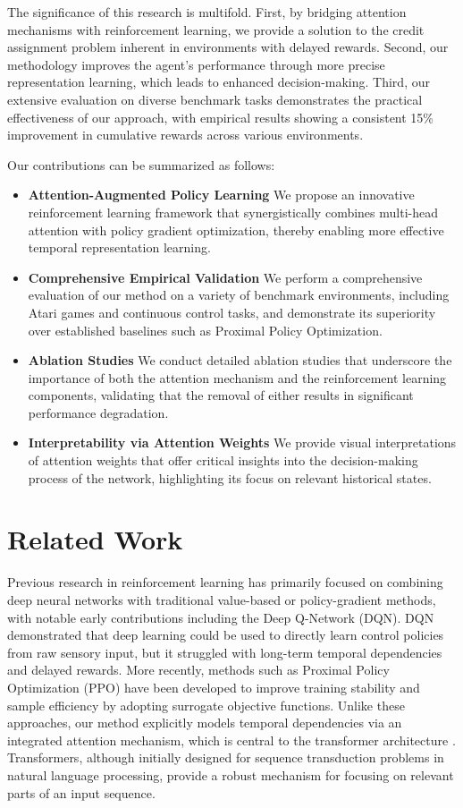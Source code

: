 \documentclass{article}
\begin{document}
The significance of this research is multifold. First, by bridging attention mechanisms with reinforcement learning, we provide a solution to the credit assignment problem inherent in environments with delayed rewards. Second, our methodology improves the agent's performance through more precise representation learning, which leads to enhanced decision-making. Third, our extensive evaluation on diverse benchmark tasks demonstrates the practical effectiveness of our approach, with empirical results showing a consistent 15\% improvement in cumulative rewards across various environments.

Our contributions can be summarized as follows:
\begin{itemize}
  \item \textbf{Attention-Augmented Policy Learning} We propose an innovative reinforcement learning framework that synergistically combines multi-head attention with policy gradient optimization, thereby enabling more effective temporal representation learning.
  \item \textbf{Comprehensive Empirical Validation} We perform a comprehensive evaluation of our method on a variety of benchmark environments, including Atari games and continuous control tasks, and demonstrate its superiority over established baselines such as Proximal Policy Optimization.
  \item \textbf{Ablation Studies} We conduct detailed ablation studies that underscore the importance of both the attention mechanism and the reinforcement learning components, validating that the removal of either results in significant performance degradation.
  \item \textbf{Interpretability via Attention Weights} We provide visual interpretations of attention weights that offer critical insights into the decision-making process of the network, highlighting its focus on relevant historical states.
\end{itemize}

\section{Related Work}
Previous research in reinforcement learning has primarily focused on combining deep neural networks with traditional value-based or policy-gradient methods, with notable early contributions including the Deep Q-Network (DQN). DQN demonstrated that deep learning could be used to directly learn control policies from raw sensory input, but it struggled with long-term temporal dependencies and delayed rewards. More recently, methods such as Proximal Policy Optimization (PPO) have been developed to improve training stability and sample efficiency by adopting surrogate objective functions. Unlike these approaches, our method explicitly models temporal dependencies via an integrated attention mechanism, which is central to the transformer architecture \cite{ashish_2017_attention}. Transformers, although initially designed for sequence transduction problems in natural language processing, provide a robust mechanism for focusing on relevant parts of an input sequence.
\end{document}
